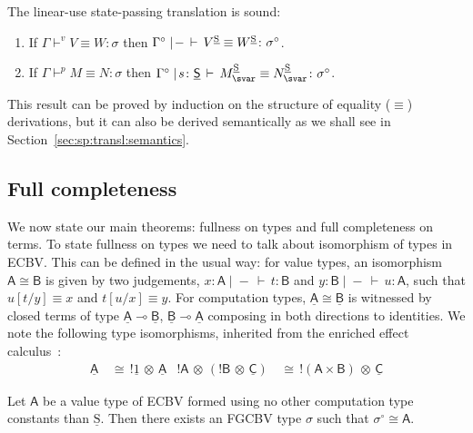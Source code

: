\documentclass{LMCS}
\newcommand{\veq}[4]{#1 \mathrel{\vdash^{v}} #2\equiv #3 \colon \! #4}
\newcommand{\peq}[4]{#1 \mathrel{\vdash^p} #2\equiv #3 \colon \! #4}
\newcommand{\STA}{\sigma}
\newcommand{\EECstate}{\underline{\mathrm{S}}}
\newcommand{\EECarbstate}{\comptype{\mathsf{S}}}
\newcommand{\comptype}[1]{\underline{#1}}
\newcommand{\co}{\colon}
\newcommand{\VA}{\mathsf{A}}
\newcommand{\VB}{\mathsf{B}}
\newcommand{\CA}{\comptype{\mathsf{A}}}
\newcommand{\CB}{\comptype{\mathsf{B}}}
\newcommand{\CC}{\comptype{\mathsf{C}}}
\newcommand{\tensor}{\otimes}
\newcommand{\ltensortype}[2]{{!} #1 \, {\tensor} \, #2}
\newcommand{\lfun}{\multimap}
\newcommand{\algone}{{\underline 1}} \newcommand{\valone}{{1}} \newcommand{\algzero}{\comptype{0}}
\newcommand{\rIn}[2]{#1 \colon  #2}
\newcommand{\aj}[4]{#1 \mid  \! #2 \, \vdash \, \rIn{#3}{#4}}
\newcommand{\aeq}[5]{#1 \mid  \! #2 \, \vdash \, \rIn{#3\equiv #4}{#5}}
\newcommand{\tj}[3]{\aj{#1}{{-}}{#2}{#3}}
\newcommand{\teq}[4]{\aj{#1}{{-}}{#2\equiv #3}{#4}}
\newcommand{\FGCBV}{FGCBV}
\newcommand{\ECBV}{ECBV}
\newcommand{\CBVtoEEC}[1]{#1^{\circ}}
\newcommand{\iso}{\cong}
\begin{document}
\begin{thm}The linear-use state-passing translation is sound: \label{thm:soundness}
\begin{enumerate}
\item
If $\veq\Gamma VW\sigma$ then 
$\teq{\CBVtoEEC \Gamma}{\CBVtoEECV{V}}{\CBVtoEECV{W}}{\CBVtoEEC \sigma}$.
\item 
If $\peq\Gamma MN\sigma$ then 
$\aeq{\CBVtoEEC \Gamma}{s\co \EECarbstate}{\CBVtoEECP{M}}{\CBVtoEECP{N}}{\CBVtoEEC \sigma}$.
\end{enumerate}
\end{thm}
This result can be proved by induction on the structure of equality
($\equiv$) derivations, but it can also be derived semantically as 
we shall see in Section~\ref{sec:sp:transl:semantics}.

\subsection{Full completeness}
We now state our main theorems: fullness on types and full completeness
on terms.
To state fullness on types we need to talk about isomorphism of types in {\ECBV}. 
This can be defined in the usual way: for
value types, an isomorphism $\VA \iso \VB$ is given by two judgements,
$\tj{x \co \VA}{t}{\VB}$ and $\tj{y \co \VB}{u}{\VA}$, such that
$u[t/y] \equiv x$ and $t[u/x] \equiv y$. For computation types, $\CA \iso \CB$ is
witnessed by closed terms of type $\CA \lfun \CB$, $\CB \lfun \CA$
composing in both directions to identities. 
We note the following type isomorphisms, inherited from 
the enriched effect calculus~\cite[\S 3]{Mogelberg:CSL:09}:
\begin{align}
\CA & \, \iso\, \ltensortype{\algone}{\CA}  \label{eq:tensor:one}
&
\ltensortype{\VA}{(\ltensortype{\VB}{\CC})} & \, \iso\, \ltensortype{(\VA \times \VB)}{\CC} 
\end{align}

\begin{thm}
\label{thm:full-on-types}
Let $\VA$ be a value type of {\ECBV} formed using no other computation type constants than $\EECstate$. Then there exists an {\FGCBV} type $\STA$ such that $\CBVtoEEC{\STA} \iso \VA$.
\end{thm}
\end{document}
